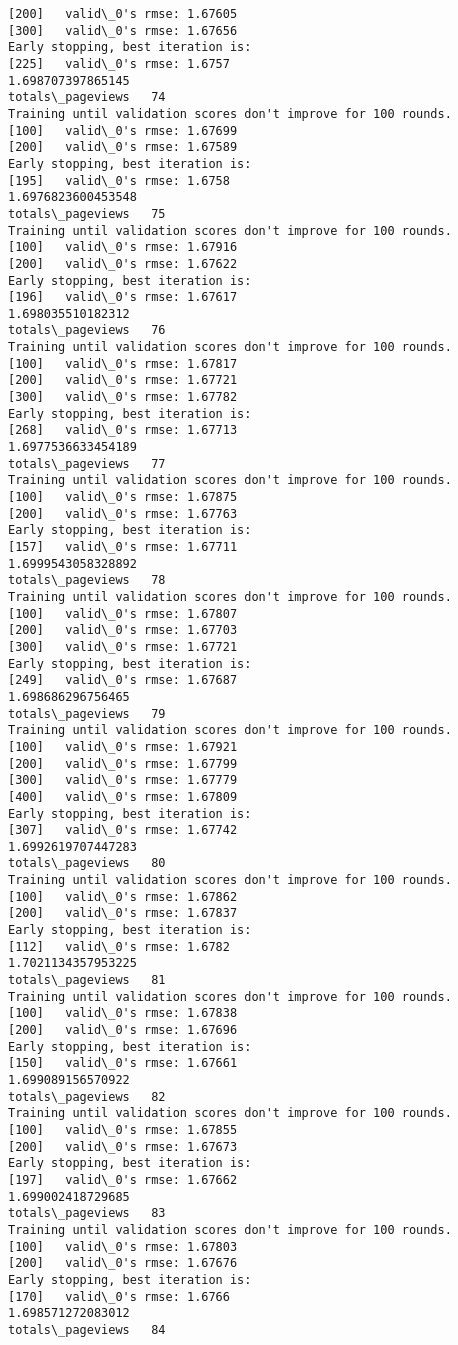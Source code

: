 \documentclass[11pt]{article}
\begin{document}
\begin{Verbatim}[commandchars=\\\{\}]
[200]	valid\_0's rmse: 1.67605
[300]	valid\_0's rmse: 1.67656
Early stopping, best iteration is:
[225]	valid\_0's rmse: 1.6757
1.698707397865145
totals\_pageviews   74
Training until validation scores don't improve for 100 rounds.
[100]	valid\_0's rmse: 1.67699
[200]	valid\_0's rmse: 1.67589
Early stopping, best iteration is:
[195]	valid\_0's rmse: 1.6758
1.6976823600453548
totals\_pageviews   75
Training until validation scores don't improve for 100 rounds.
[100]	valid\_0's rmse: 1.67916
[200]	valid\_0's rmse: 1.67622
Early stopping, best iteration is:
[196]	valid\_0's rmse: 1.67617
1.698035510182312
totals\_pageviews   76
Training until validation scores don't improve for 100 rounds.
[100]	valid\_0's rmse: 1.67817
[200]	valid\_0's rmse: 1.67721
[300]	valid\_0's rmse: 1.67782
Early stopping, best iteration is:
[268]	valid\_0's rmse: 1.67713
1.6977536633454189
totals\_pageviews   77
Training until validation scores don't improve for 100 rounds.
[100]	valid\_0's rmse: 1.67875
[200]	valid\_0's rmse: 1.67763
Early stopping, best iteration is:
[157]	valid\_0's rmse: 1.67711
1.6999543058328892
totals\_pageviews   78
Training until validation scores don't improve for 100 rounds.
[100]	valid\_0's rmse: 1.67807
[200]	valid\_0's rmse: 1.67703
[300]	valid\_0's rmse: 1.67721
Early stopping, best iteration is:
[249]	valid\_0's rmse: 1.67687
1.698686296756465
totals\_pageviews   79
Training until validation scores don't improve for 100 rounds.
[100]	valid\_0's rmse: 1.67921
[200]	valid\_0's rmse: 1.67799
[300]	valid\_0's rmse: 1.67779
[400]	valid\_0's rmse: 1.67809
Early stopping, best iteration is:
[307]	valid\_0's rmse: 1.67742
1.6992619707447283
totals\_pageviews   80
Training until validation scores don't improve for 100 rounds.
[100]	valid\_0's rmse: 1.67862
[200]	valid\_0's rmse: 1.67837
Early stopping, best iteration is:
[112]	valid\_0's rmse: 1.6782
1.7021134357953225
totals\_pageviews   81
Training until validation scores don't improve for 100 rounds.
[100]	valid\_0's rmse: 1.67838
[200]	valid\_0's rmse: 1.67696
Early stopping, best iteration is:
[150]	valid\_0's rmse: 1.67661
1.699089156570922
totals\_pageviews   82
Training until validation scores don't improve for 100 rounds.
[100]	valid\_0's rmse: 1.67855
[200]	valid\_0's rmse: 1.67673
Early stopping, best iteration is:
[197]	valid\_0's rmse: 1.67662
1.699002418729685
totals\_pageviews   83
Training until validation scores don't improve for 100 rounds.
[100]	valid\_0's rmse: 1.67803
[200]	valid\_0's rmse: 1.67676
Early stopping, best iteration is:
[170]	valid\_0's rmse: 1.6766
1.698571272083012
totals\_pageviews   84

\end{Verbatim}
\end{document}
